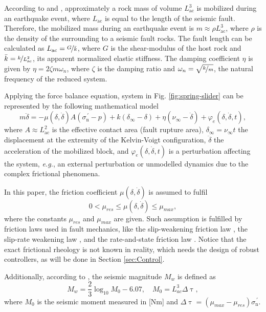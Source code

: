 \documentclass[journal,twoside,web]{ieeecolor}
\begin{document}
According to \cite{b:Scholz-2002} and \cite{b:Kanamori-Brodsky-2004}, approximately a rock mass of volume $L_{\text{ac}}^3$ is mobilized during an earthquake event, where $L_{\text{ac}}$ is equal to the length of the seismic fault. Therefore, the mobilized mass during an earthquake event is $m \approx \rho L_{\text{ac}}^3$, where $\rho$ is the density of the surrounding to a seismic fault rocks. The fault length can be calculated as $L_{\text{ac}}=\nicefrac{G}{\bar{k}}$, where $G$ is the shear-modulus of the host rock and $\bar{k} = \nicefrac{k}{L_{\text{ac}}^2}$, its apparent normalized elastic stiffness. The damping coefficient $\eta$ is given by $\eta=2\zeta m \omega_n$, where $\zeta$ is the damping ratio and $\omega_n=\sqrt{\nicefrac{k}{m}}$, the natural frequency of the reduced system.

Applying the force balance equation, system in Fig. \ref{fig:spring-slider} can be represented by the following mathematical model
\begin{equation}
m \ddot{\delta} = -\mu(\delta,\dot{\delta})A(\sigma^{\, \prime}_{\text{n}}-p) + k(\delta_\infty-\delta) + \eta(\nu_\infty-\dot{\delta})+\varphi_e(\delta,\dot{\delta},t),
\label{eq:springmodel}
\end{equation}
where $A \approx L_{\text{ac}}^2$ is the effective contact area (fault rupture area), $\delta_\infty=\nu_\infty t$ the displacement at the extremity of the Kelvin-Voigt configuration, $\ddot{\delta}$ the acceleration of the mobilized block, and $\varphi_e(\delta,\dot{\delta},t)$ is a perturbation affecting the system, \textit{e.g.}, an external perturbation or unmodelled dynamics due to the complex frictional phenomena. 

In this paper, the friction coefficient $\mu(\delta,\dot{\delta})$ is assumed to fulfil
\begin{equation}
  0<\mu_{res} \leq \mu(\delta,\dot{\delta}) \leq \mu_{max},
  \label{eq:mug}
\end{equation}
where the constants $\mu_{res}$ and $\mu_{max}$ are given. Such assumption is fulfilled by friction laws used in fault mechanics, like the slip-weakening friction law \cite{b:Kanamori-Brodsky-2004}, the slip-rate weakening law \cite{b:Huang1992a}, and the rate-and-state friction law \cite{b:Dieterich1981,b:Ruina-1983}. Notice that the exact frictional rheology is not known in reality, which needs the design of robust controllers, as will be done in Section \ref{sec:Control}.

Additionally, according to \cite{b:Kanamori-Brodsky-2004}, the seismic magnitude $M_w$ is defined as
\begin{equation}
  M_w = \frac{2}{3} \log_{10}M_0-6.07, \quad M_0 = L_{ac}^3 \Delta \uptau,
  \label{eq:magnitude}
\end{equation}
where $M_0$ is the seismic moment measured in [Nm] and $\Delta \uptau=(\mu_{max}-\mu_{res})\sigma^{\, \prime}_{\text{n}}$.
\end{document}
